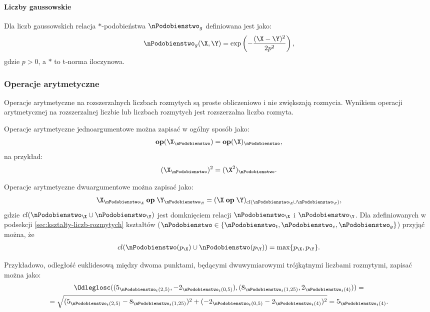\documentclass[a4paper,twoside,12pt]{book}
\begin{document}
\paragraph{Liczby gaussowskie}

Dla liczb gaussowskich relacja $\ast$-podobieństwa $\nPodobienstwo_{g}$ definiowana jest jako:
\begin{align}
	\nPodobienstwo_{g}(\X,\Y) = \exp \left(- \frac{(\X-\Y)^{2}}{2p^{2}} \right),
\end{align}
gdzie $p > 0$, a $\ast$ to t-norma iloczynowa.

\subsubsection{Operacje arytmetyczne}

Operacje arytmetyczne na rozszerzalnych liczbach rozmytych są proste obliczeniowo i nie zwiększają rozmycia. Wynikiem operacji arytmetycznej na rozszerzalnej liczbie lub liczbach rozmytych jest rozszerzalna liczba rozmyta.

Operacje arytmetyczne jednoargumentowe można zapisać w ogólny sposób jako:
\begin{align}
	\mathbf{op}(\X_{\nPodobienstwo}) = \mathbf{op}(\X)_{\nPodobienstwo},
\end{align}
na przykład:
\begin{align}
	(\X_{\nPodobienstwo})^{2} = (\X^{2})_{\nPodobienstwo}.
\end{align}

Operacje arytmetyczne dwuargumentowe można zapisać jako:
\begin{align}
	\X_{\nPodobienstwo_{\X}} \; \mathbf{op} \; \Y_{\nPodobienstwo_{\Y}} = (\X \; \mathbf{op} \; \Y)_{cl(\nPodobienstwo_{\X} \cup \nPodobienstwo_{\Y})},
\end{align}
gdzie $cl(\nPodobienstwo_{\X} \cup \nPodobienstwo_{\Y})$ jest domknięciem relacji $\nPodobienstwo_{\X}$ i $\nPodobienstwo_{\Y}$. Dla zdefiniowanych w podsekcji \ref{sec:ksztalty-liczb-rozmytych} kształtów ($\nPodobienstwo \in \{ \nPodobienstwo_{t}, \nPodobienstwo_{e}, \nPodobienstwo_{g}\}$) przyjąć można, że
\begin{align}
	cl(\nPodobienstwo(p_{\X}) \cup \nPodobienstwo(p_{\Y})) = \max\{p_{\X}, p_{\Y}\}.
\end{align}

Przykładowo, odległość euklidesową między dwoma punktami, będącymi dwuwymiarowymi trójkątnymi liczbami rozmytymi, zapisać można jako:
\begin{multline}
	\Odleglosc ((5_{\nPodobienstwo_{t}(2,5)}, -2_{\nPodobienstwo_{t}(0,5)}), (8_{\nPodobienstwo_{t}(1,25)}, 2_{\nPodobienstwo_{t}(4)})) = \\
	= \sqrt{(5_{\nPodobienstwo_{t}(2,5)} - 8_{\nPodobienstwo_{t}(1,25)})^{2} + (-2_{\nPodobienstwo_{t}(0,5)} - 2_{\nPodobienstwo_{t}(4)})^{2}} = 5_{\nPodobienstwo_{t}(4)}.
\end{multline}
\end{document}

